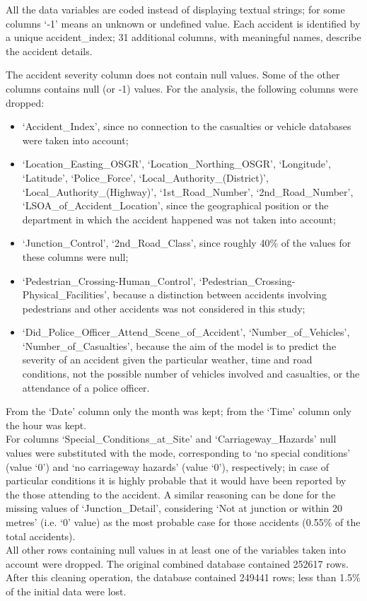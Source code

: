 \documentclass[11pt]{article}
\begin{document}
All the data variables are coded instead of displaying textual strings; for some columns `-1' means an unknown or undefined value. Each accident is identified by a unique accident\_index; 31 additional columns, with meaningful names, describe the accident details.

The accident severity column does not contain null values. Some of the other columns contains null (or -1) values.  
For the analysis, the following columns were dropped:
\begin{itemize}
\item
`Accident\_Index', since no connection to the casualties or vehicle databases were taken into account;
\item
`Location\_Easting\_OSGR', `Location\_Northing\_OSGR', `Longitude', `Latitude', `Police\_Force', `Local\_Authority\_(District)', `Local\_Authority\_(Highway)', `1st\_Road\_Number', `2nd\_Road\_Number', `LSOA\_of\_Accident\_Location', since the geographical position or the department in which the accident happened was not taken into account;
\item
`Junction\_Control', `2nd\_Road\_Class', since roughly 40\% of the values for these columns were null;
\item
`Pedestrian\_Crossing-Human\_Control', `Pedestrian\_Crossing-Physical\_Facilities', because a distinction between accidents involving pedestrians and other accidents was not considered in this study;
\item
`Did\_Police\_Officer\_Attend\_Scene\_of\_Accident', `Number\_of\_Vehicles', `Number\_of\_Casualties', because the aim of the model is to predict the severity of an accident given the particular weather, time and road conditions, not the possible number of vehicles involved and casualties, or the attendance of a police officer.
\end{itemize}

From the `Date' column only the month was kept; from the `Time' column only the hour was kept.\\ 
For columns `Special\_Conditions\_at\_Site' and `Carriageway\_Hazards' null values were substituted with the mode, corresponding to `no special conditions' (value `0') and `no carriageway hazards' (value `0'), respectively; in case of particular conditions it is highly probable that it would have been reported by the those attending to the accident. A similar reasoning can be done for the missing values of `Junction\_Detail', considering `Not at junction or within 20 metres' (i.e. `0' value) as the most probable case for those accidents (0.55\% of the total accidents).\\ 
All other rows containing null values in at least one of the variables taken into account were dropped. The original combined database contained 252617 rows. After this cleaning operation, the database contained 249441 rows; less than 1.5\% of the initial data were lost.
\end{document}
